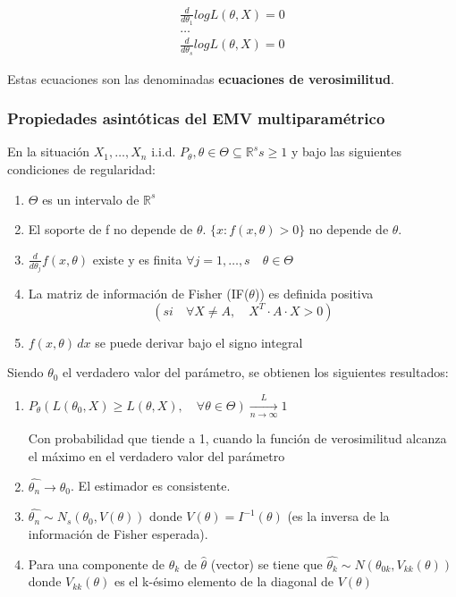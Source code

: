 \[
\begin{matrix}
    \frac{d}{d \theta_1} log L(\theta,X)=0 \\
    \dots \\
    \frac{d}{d \theta_s} log L(\theta,X)=0
\end{matrix}
\]

Estas ecuaciones son las denominadas \textbf{ecuaciones de verosimilitud}.

\subsubsection*{Propiedades asintóticas del EMV multiparamétrico}

En la situación $X_1,\dots,X_n$ i.i.d. $P_\theta, \theta \in \Theta \subseteq \mathbb{R}^s s\geq1$
y bajo las siguientes condiciones de regularidad:

\begin{enumerate}
    \item $\Theta$ es un intervalo de $\mathbb{R}^s$
    \item El soporte de f no depende de $\theta$. $\{x:f(x,\theta)>0\}$ no depende de $\theta$.
    \item $\frac{d}{d \theta_j} f(x,\theta)$ existe y es finita $\forall j=1,\dots,s \quad \theta \in \Theta$
    \item La matriz de información de Fisher (IF($\theta$)) es definida positiva \[ (si \quad \forall X \neq A, \quad X^T \cdot A \cdot X >0) \]
    \item $f(x,\theta) \,dx$ se puede derivar bajo el signo integral
\end{enumerate}
\newpage
Siendo $\theta_0$ el verdadero valor del parámetro, se obtienen los siguientes resultados:

\begin{enumerate}
    \item $P_\theta(L(\theta_0,X)\geq L(\theta,X),\quad \forall \theta \in \Theta) \xrightarrow[n \to \infty]{L}1$
    
    Con probabilidad que tiende a 1, cuando la función de verosimilitud alcanza el máximo en el verdadero valor del parámetro
    \item $\hat{\theta_n} \to \theta_0$. El estimador es consistente.
    \item $\hat{\theta_n} \sim N_s(\theta_0,V(\theta))$ donde $V(\theta)=I^{-1}(\theta)$ (es la inversa de la información de Fisher esperada).
    \item Para una componente de $\hat{\theta_k}$ de $\hat{\theta}$ (vector) se tiene que $\hat{\theta_k} \sim N(\theta_{0k},V_{kk}(\theta))$
    donde $V_{kk}(\theta)$ es el k-ésimo elemento de la diagonal de $V(\theta)$
\end{enumerate}


